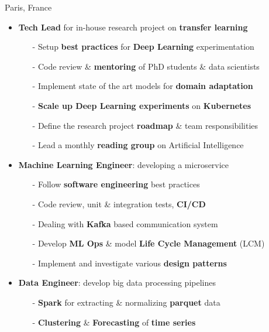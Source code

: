 \documentclass[10pt,a4paper,ragged2e]{altacv}
\begin{document}
     {Paris, France}
\begin{itemize}
    \item \textbf{Tech Lead} for in-house research project on \textbf{transfer learning}
    \vspace{0.3em}
    \begin{itemize}
    	\item[-] Setup \textbf{best practices} for \textbf{Deep Learning} experimentation
        \item[-] Code review \& \textbf{mentoring} of PhD students \& data scientists
        \item[-] Implement state of the art models for \textbf{domain adaptation}
        \item[-] \textbf{Scale up Deep Learning experiments} on \textbf{Kubernetes}
        \item[-] Define the research project \textbf{roadmap} \& team responsibilities
        \item[-] Lead a monthly \textbf{reading group} on Artificial Intelligence
    \end{itemize}
    \item \textbf{Machine Learning Engineer}: developing a microservice
    \vspace{0.3em}
    \begin{itemize}
        \item[-] Follow \textbf{software engineering} best practices
        \item[-] Code review, unit \& integration tests, \textbf{CI/CD}
        \item[-] Dealing with \textbf{Kafka} based communication system 
        \item[-] Develop \textbf{ML Ops} \& model \textbf{Life Cycle Management} (LCM) 
        \item[-] Implement and investigate various \textbf{design patterns}
    \end{itemize}
	
	\item \textbf{Data Engineer}: develop big data processing pipelines 
	\vspace{0.3em}
	\begin{itemize}
		\item[-] \textbf{Spark} for extracting \& normalizing \textbf{parquet} data
		\item[-] \textbf{Clustering} \& \textbf{Forecasting} of \textbf{time series} 
	\end{itemize}
	
\end{itemize}
\end{document}
